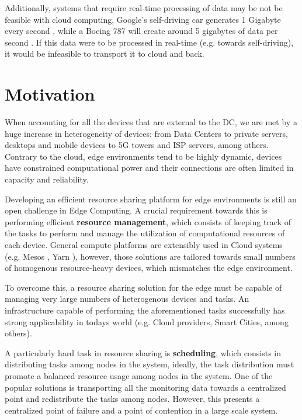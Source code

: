 Additionally, systems that require real-time processing of data may be not be feasible with cloud computing, Google's self-driving car generates 1 Gigabyte every second \cite{datafloq}, while a Boeing 787 will create around 5 gigabytes of data per second \cite{finnegan_2013}. If this data were to be processed in real-time (e.g. towards self-driving), it would be infeasible to transport it to cloud and back. 

\section{Motivation}

When accounting for all the devices that are external to the DC, we are met by a huge increase in heterogeneity of devices: from Data Centers to private servers, desktops and mobile devices to 5G towers and ISP servers, among others.  Contrary to the cloud, edge environments tend to be highly dynamic, devices have constrained computational power and their connections are often limited in capacity and reliability. 

Developing an efficient resource sharing platform for edge environments is still an open challenge in Edge Computing. A crucial requirement towards this is performing efficient \textbf{resource management}, which consists of keeping track of the tasks to perform and manage the utilization of computational resources of each device. General compute platforms are extensibly used in Cloud systems (e.g. Mesos \cite{hindman2011mesos}, Yarn \cite{Vavilapalli2013ApacheHY}), however, those solutions are tailored towards small numbers of homogenous resource-heavy devices, which mismatches the edge environment.

To overcome this, a resource sharing solution for the edge must be capable of managing very large numbers of heterogenous devices and tasks. An infrastructure capable of performing the aforementioned tasks successfully has strong applicability in todays world (e.g. Cloud providers, Smart Cities, among others). 

A particularly hard task in resource sharing is \textbf{scheduling}, which consists in distributing tasks among nodes in the system, ideally, the task distribution must promote a balanced resource usage among nodes in the system. One of the popular solutions is transporting all the monitoring data towards a centralized point and redistribute the tasks among nodes. However, this presents a centralized point of failure and a point of contention in a large scale system. 


